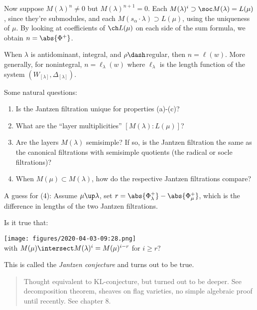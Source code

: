 Now suppose \(M(\lambda)^n \neq 0\) but \(M(\lambda)^{n+1} = 0\). Each
\(M(\lambda)^i \supset \soc M(\lambda) = L(\mu)\), since they're
submodules, and each \(M(s_\alpha \cdot \lambda) \supset L(\mu)\), using
the uniqueness of \(\mu\). By looking at coefficients of \(\ch L(\mu)\)
on each side of the sum formula, we obtain \(n = \abs{\Phi^+}\).

\begin{description}
\tightlist
\item[Exercise (5.3)]
When \(\lambda\) is antidominant, integral, and \(\rho\dash\)regular,
then \(n = \ell(w)\). More generally, for nonintegral,
\(n = \ell_\lambda(w)\) where \(\ell_\lambda\) is the length function of
the system \((W_{[\lambda]}, \Delta_{[\lambda]})\).
\end{description}

Some natural questions:

\begin{enumerate}
\def\labelenumi{\arabic{enumi}.}
\tightlist
\item
  Is the Jantzen filtration unique for properties (a)-(c)?
\item
  What are the ``layer multiplicities'' \([M(\lambda): L(\mu)]\)?
\item
  Are the layers \(M(\lambda)\) semisimple? If so, is the Jantzen
  filtration the same as the canonical filtrations with semisimple
  quotients (the radical or socle filtrations)?
\item
  When \(M(\mu) \subset M(\lambda)\), how do the respective Jantzen
  filtrations compare?
\end{enumerate}

A guess for (4): Assume \(\mu \up \lambda\), set
\(r = \abs{\Phi^+_\lambda} - \abs{\Phi_\mu^+}\), which is the difference
in lengths of the two Jantzen filtrations.

Is it true that:

\texttt{[image: figures/2020-04-03-09:28.png]}\\

with \(M(\mu) \intersect M(\lambda)^i = M(\mu)^{i-r}\) for \(i\geq r\)?

This is called the \emph{Jantzen conjecture} and turns out to be true.

\begin{quote}
Thought equivalent to KL-conjecture, but turned out to be deeper. See
decomposition theorem, sheaves on flag varieties, no simple algebraic
proof until recently. See chapter 8.
\end{quote}

